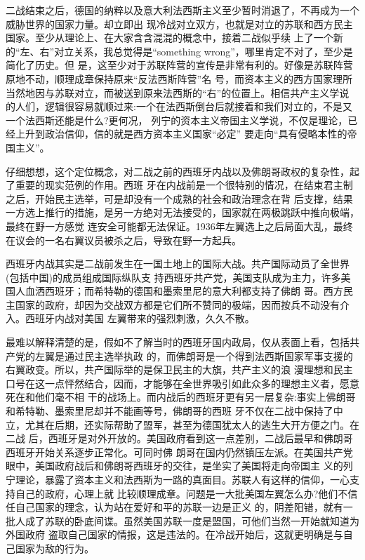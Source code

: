 \documentclass[10pt]{article}
\begin{document}
{二战结束之后，德国的纳粹以及意大利法西斯主义至少暂时消退了，不再成为一个威胁世界的国家力量。却立即出
现冷战对立双方，也就是对立的苏联和西方民主国家。至少从理论上、在大家含含混混的概念中，接着二战似乎续
上了一个新的``左、右''对立关系，我总觉得是``something wrong''，哪里肯定不对了，至少是简化了历史。但
是，这至少对于苏联阵营的宣传是非常有利的。好像是苏联阵营原地不动，顺理成章保持原来``反法西斯阵营''名
号，而资本主义的西方国家理所当然地因与苏联对立，而被送到原来法西斯的``右''的位置上。相信共产主义学说
的人们，逻辑很容易就顺过来:一个在法西斯倒台后就接着和我们对立的，不是又一个法西斯还能是什么?更何况，
列宁的资本主义\myrule 帝国主义学说，不仅是理论，已经上升到政治信仰，信的就是西方资本主义国家``必定''
要走向``具有侵略本性的帝国主义''。

仔细想想，这个定位概念，对二战之前的西班牙内战以及佛朗哥政权的复杂性，起了重要的现实范例的作用。西班
牙在内战前是一个很特别的情况，在结束君主制之后，开始民主选举，可是却没有一个成熟的社会和政治理念在背
后支撑，结果一方选上推行的措施，是另一方绝对无法接受的，国家就在两极跳跃中推向极端，最终在野一方感觉
连安全可能都无法保证。1936年左翼选上之后局面大乱，最终在议会的一名右翼议员被杀之后，导致在野一方起兵。

西班牙内战其实是二战前发生在一国土地上的国际大战。共产国际动员了全世界(包括中国)的成员组成国际纵队支
持西班牙共产党，美国支队成为主力，许多美国人血洒西班牙；而希特勒的德国和墨索里尼的意大利都支持了佛朗
哥。西方民主国家的政府，却因为交战双方都是它们所不赞同的极端，因而按兵不动没有介入。西班牙内战对美国
左翼带来的强烈刺激，久久不散。

最难以解释清楚的是，假如不了解当时的西班牙国内政局，仅从表面上看，包括共产党的左翼是通过民主选举执政
的，而佛朗哥是一个得到法西斯国家军事支援的右翼政变。所以，共产国际举的是保卫民主的大旗，共产主义的浪
漫理想和民主口号在这一点怦然结合，因而，才能够在全世界吸引如此众多的理想主义者，愿意死在和他们毫不相
干的战场上。而内战后的西班牙更有另一层复杂:事实上佛朗哥和希特勒、墨索里尼却并不能画等号，佛朗哥的西班
牙不仅在二战中保持了中立，尤其在后期，还实际帮助了盟军，甚至为德国犹太人的逃生大开方便之门。在二战
后，西班牙是对外开放的。美国政府看到这一点差别，二战后最早和佛朗哥西班牙开始关系逐步正常化。可同时佛
朗哥在国内仍然镇压左派。在美国共产党眼中，美国政府战后和佛朗哥西班牙的交往，是坐实了美国将走向帝国主
义的列宁理论，暴露了资本主义和法西斯为一路的真面目。苏联人有这样的信仰，一心支持自己的政府，心理上就
比较顺理成章。问题是一大批美国左翼怎么办?他们不信任自己国家的理念，认为站在爱好和平的苏联一边是正义
的，阴差阳错，就有一批人成了苏联的卧底间谍。虽然美国苏联一度是盟国，可他们当然一开始就知道为外国政府
盗取自己国家的情报，这是违法的。在冷战开始后，这就更明确是与自己国家为敌的行为。

}
\end{document}
